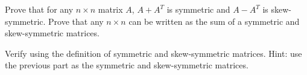 
\begin{Exercise}[
name={},
title={}, 
difficulty=0,
origin={\cite{GH}}]
\Question Prove that for any $n \times n$ matrix $A$, $A + A^T$ is symmetric and $A-A^T$ is skew-symmetric.
\Question Prove that any $n \times n$ can be written as the sum of a symmetric and skew-symmetric matrices. 
\end{Exercise}

\begin{Answer}
\Question Verify using the definition of symmetric and skew-symmetric matrices.
\Question Hint: use the previous part as the symmetric and skew-symmetric matrices.
\end{Answer}
